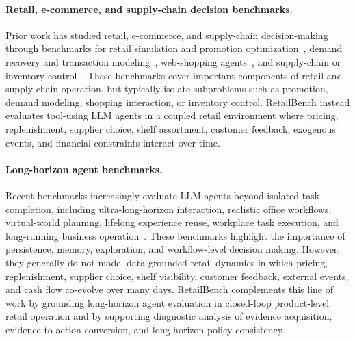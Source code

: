 \paragraph{Retail, e-commerce, and supply-chain decision benchmarks.}
Prior work has studied retail, e-commerce, and supply-chain decision-making through benchmarks for retail simulation and promotion optimization~\citep{xia2023retailsynth,xia2024simulationretailpromotions}, demand recovery and transaction modeling~\citep{wang2025freshretailnet,tkachuk2024consumertransactions}, web-shopping agents~\citep{wang2025shoppingbench,3webshopscalablerealworldweb}, and supply-chain or inventory control~\citep{OFCOURSE,inventory,leluc2023marlimmultiagentreinforcementlearning,invagentlargelanguagemodel,aimbenchevaluatingdecisionmakingbiases}. These benchmarks cover important components of retail and supply-chain operation, but typically isolate subproblems such as promotion, demand modeling, shopping interaction, or inventory control. RetailBench instead evaluates tool-using LLM agents in a coupled retail environment where pricing, replenishment, supplier choice, shelf assortment, customer feedback, exogenous events, and financial constraints interact over time.

\paragraph{Long-horizon agent benchmarks.}
Recent benchmarks increasingly evaluate LLM agents beyond isolated task completion, including ultra-long-horizon interaction, realistic office workflows, virtual-world planning, lifelong experience reuse, workplace task execution, and long-running business operation~\citep{utltabench,odysseybenchevaluatingllmagents,herobenchbenchmarklonghorizonplanning,zheng2025lifelongagentbench,xu2024theagentcompany,backlund2025vendingbenchbenchmarklongtermcoherence,andonlabs2025vendingbench2}. These benchmarks highlight the importance of persistence, memory, exploration, and workflow-level decision making. However, they generally do not model data-grounded retail dynamics in which pricing, replenishment, supplier choice, shelf visibility, customer feedback, external events, and cash flow co-evolve over many days. RetailBench complements this line of work by grounding long-horizon agent evaluation in closed-loop product-level retail operation and by supporting diagnostic analysis of evidence acquisition, evidence-to-action conversion, and long-horizon policy consistency.